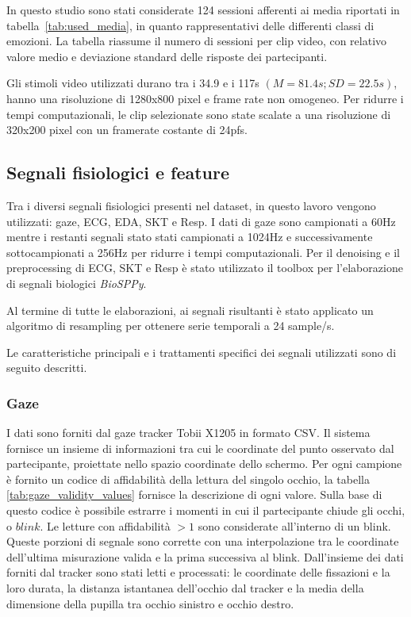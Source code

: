 In questo studio sono stati considerate 124 sessioni afferenti ai media riportati in tabella~\ref{tab:used_media}, in quanto rappresentativi delle differenti classi di emozioni. La tabella riassume il numero di sessioni per clip video, con relativo valore medio e deviazione standard delle risposte dei partecipanti.

Gli stimoli video utilizzati durano tra i 34.9 e i 117s $(M=81.4s; SD=22.5s)$, hanno una risoluzione di 1280x800 pixel e frame rate non omogeneo. Per ridurre i tempi computazionali, le clip selezionate sono state scalate a una risoluzione di 320x200 pixel con un framerate costante di 24pfs.

\subsection{Segnali fisiologici e feature}

Tra i diversi segnali fisiologici presenti nel dataset, in questo lavoro vengono utilizzati: gaze, ECG, EDA, SKT e Resp.
I dati di gaze sono campionati a 60Hz mentre i restanti segnali stato stati campionati a 1024Hz e successivamente sottocampionati a 256Hz per ridurre i tempi computazionali. Per il denoising e il preprocessing di ECG, SKT e Resp è stato utilizzato il toolbox per l'elaborazione di segnali biologici \emph{BioSPPy}\cite{carreiras2018biosppy}.

Al termine di tutte le elaborazioni, ai segnali risultanti è stato applicato un algoritmo di resampling per ottenere serie temporali a 24 sample/s.

Le caratteristiche principali e i trattamenti specifici dei segnali utilizzati sono di seguito descritti.

\subsubsection{Gaze}
I dati sono forniti dal gaze tracker Tobii X1205 in formato CSV. Il sistema fornisce un insieme di informazioni tra cui le coordinate del punto osservato dal partecipante, proiettate nello spazio coordinate dello schermo. Per ogni campione è fornito un codice di affidabilità della lettura del singolo occhio, la tabella \ref{tab:gaze_validity_values} fornisce la descrizione di ogni valore. Sulla base di questo codice è possibile estrarre i momenti in cui il partecipante chiude gli occhi, o $blink$. Le letture con affidabilità $>1$ sono considerate all'interno di un blink. Queste porzioni di segnale sono corrette con una interpolazione tra le coordinate dell'ultima misurazione valida e la prima successiva al blink. Dall'insieme dei dati forniti dal tracker sono stati letti e processati: le coordinate delle fissazioni e la loro durata, la distanza istantanea dell'occhio dal tracker e la media della dimensione della pupilla tra occhio sinistro e occhio destro.

